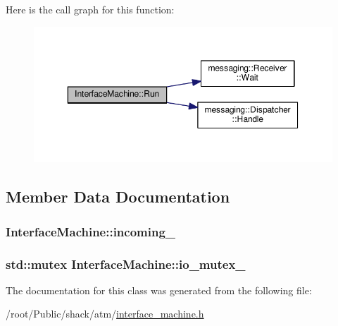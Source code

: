 Here is the call graph for this function\-:\nopagebreak
\begin{figure}[H]
\begin{center}
\leavevmode
\includegraphics[width=350pt]{classInterfaceMachine_a046f9d3bb23bf7e0b53e68ad152d755d_cgraph}
\end{center}
\end{figure}




\subsection{Member Data Documentation}
\hypertarget{classInterfaceMachine_a9a6baaba223e2a23ead6e80d25c02c59}{
\subsubsection[{incoming\-\_\-}]{ Interface\-Machine\-::incoming\-\_\-\hspace{0.3cm}{\ttfamily [private]}}}\label{classInterfaceMachine_a9a6baaba223e2a23ead6e80d25c02c59}
\hypertarget{classInterfaceMachine_a00f26d214b26780bca26e8033d2d4921}{
\subsubsection[{io\-\_\-mutex\-\_\-}]{\setlength{\rightskip}{0pt plus 5cm}std\-::mutex Interface\-Machine\-::io\-\_\-mutex\-\_\-\hspace{0.3cm}{\ttfamily [private]}}}\label{classInterfaceMachine_a00f26d214b26780bca26e8033d2d4921}


The documentation for this class was generated from the following file\-:\begin{DoxyCompactItemize}
\item 
/root/\-Public/shack/atm/\hyperlink{interface__machine_8h}{interface\-\_\-machine.\-h}\end{DoxyCompactItemize}
